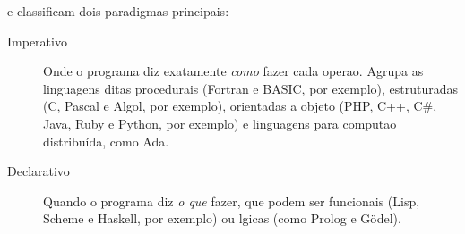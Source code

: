 \cite{Aho08} e \cite{wiki:lingprog} classificam dois paradigmas principais:

\begin{description}
\item[Imperativo] Onde o programa diz exatamente \emph{como} fazer cada opera\ca o. Agrupa as linguagens ditas procedurais (Fortran e BASIC, por exemplo), estruturadas (C, Pascal e Algol, por exemplo), orientadas a objeto (PHP, C++, C\#, Java, Ruby e Python, por exemplo) e linguagens para computa\ca o distribu\'ida, como Ada.
\item[Declarativo] Quando o programa diz \emph{o que} fazer, que podem ser funcionais (Lisp, Scheme e Haskell, por exemplo) ou l\oh gicas (como Prolog e G\"odel).\\[2.5cm]
\end{description}
